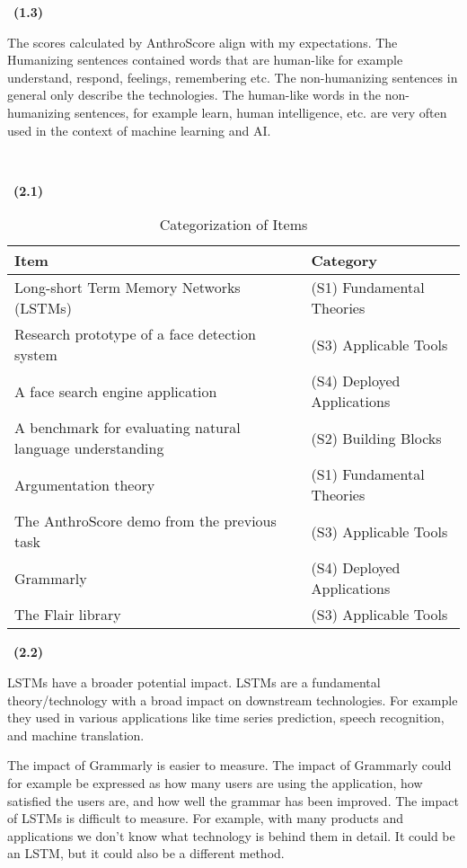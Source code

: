 \documentclass[a4 paper]{article}
\numberwithin{equation}{section}
\newcommand{\problem}[2]{~\\\fbox{\textbf{Problem #1}}\newline\newline}
\newcommand{\subproblem}[1]{~\newline\textbf{(#1)}}
\newcommand{\0}{\mathbf{0}}
\begin{document}
\subproblem{1.3}

The scores calculated by AnthroScore align with my expectations. The Humanizing sentences contained words that are human-like for example understand, respond, feelings, remembering etc. The non-humanizing sentences in general only describe the technologies. The human-like words in the non-humanizing sentences, for example learn, human intelligence, etc. are very often used in the context of machine learning and AI.

\pagebreak

\problem{2}{×}

\subproblem{2.1}

\begin{table}[h!]
\centering
\begin{tabular}{|l|l|}
\hline
\textbf{Item} & \textbf{Category} \\ \hline
Long-short Term Memory Networks (LSTMs) & (S1) Fundamental Theories \\ \hline
Research prototype of a face detection system & (S3) Applicable Tools \\ \hline
A face search engine application & (S4) Deployed Applications \\ \hline
A benchmark for evaluating natural language understanding & (S2) Building Blocks \\ \hline
Argumentation theory & (S1) Fundamental Theories \\ \hline
The AnthroScore demo from the previous task & (S3) Applicable Tools \\ \hline
Grammarly & (S4) Deployed Applications \\ \hline
The Flair library & (S3) Applicable Tools \\ \hline
\end{tabular}
\caption{Categorization of Items}
\label{table:categorization}
\end{table}

\subproblem{2.2}

LSTMs have a broader potential impact. LSTMs are a fundamental theory/technology with a broad impact on downstream technologies. For example they used in various applications like time series prediction, speech recognition, and machine translation.

The impact of Grammarly is easier to measure. The impact of Grammarly could for example be expressed as how many users are using the application, how satisfied the users are, and how well the grammar has been improved. The impact of LSTMs is difficult to measure. For example, with many products and applications we don't know what technology is behind them in detail. It could be an LSTM, but it could also be a different method.
\end{document}
